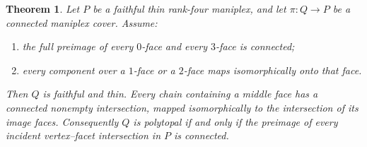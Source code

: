 \documentclass[a4paper,11pt]{article}
\newtheorem{theorem}{Theorem}\newtheorem{lemma}[theorem]{Lemma}\newtheorem{corollary}[theorem]{Corollary}
\begin{document}
\begin{theorem}\label{faces}
Let $P$ be a faithful thin rank-four maniplex, and let $\pi:Q\to P$ be a
connected maniplex cover. Assume:
\begin{enumerate}
\item the full preimage of every $0$-face and every $3$-face is connected;
\item every component over a $1$-face or a $2$-face maps isomorphically
onto that face.
\end{enumerate}
Then $Q$ is faithful and thin. Every chain containing a middle face has
a connected nonempty intersection, mapped isomorphically to the
intersection of its image faces. Consequently $Q$ is polytopal if and
only if the preimage of every incident vertex--facet intersection in
$P$ is connected.
\end{theorem}
\end{document}
